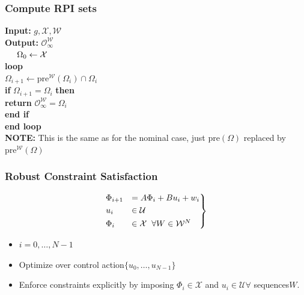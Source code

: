     \subsubsection{Compute RPI sets}
    \textbf{Input: }$g,\mathcal{X,W}$\\
    \textbf{Output: }$\mathcal{O}^\mathcal{W}_\infty$\\
        $\hspace*{5mm} \Omega_0 \leftarrow \mathcal{X}$\\
         \hspace*{5mm}\textbf{loop}\\
         \hspace*{8mm}$\Omega_{i+1} \leftarrow \textrm{pre}^\mathcal{W}(\Omega_i) \cap\Omega_i$\\
         \hspace*{8mm}\textbf{if }$\Omega_{i+1} = \Omega_i$ \textbf{then}\\
         \hspace*{10mm}\textbf{return} $\mathcal{O} ^\mathcal{W}_\infty = \Omega_i$\\
         \hspace*{8mm}\textbf{end if}\\
         \hspace*{5mm}\textbf{end loop}\\
    \textbf{NOTE:} This is the same as for the nominal case, just $\mathrm{pre}(\Omega)$ replaced by $\mathrm{pre}^\mathcal{W}(\Omega)$
    \subsubsection{Robust Constraint Satisfaction}
    \begin{minipage}{0.2\linewidth}
        \begin{align*}
        \begin{rcases}
            \Phi_{i+1} &= A\Phi_i+Bu_i + w_i\\
            u_i &\in \mathcal{U}\\
            \Phi_i &\in \mathcal{X}\hspace{2mm}\forall W \in \mathcal{W}^N
        \end{rcases}
        \end{align*}
    \end{minipage}
    \begin{minipage}{0.5\linewidth}
         \begin{itemize}
             \item $i=0,\dots,N-1$
             \item Optimize over control action$\{u_0,\dots,u_{N-1}\}$
             \item Enforce constraints explicitly by imposing $\Phi_i\in\mathcal{X}$ and $u_i\in \mathcal{U}\forall$ sequences$W$.
         \end{itemize}
    \end{minipage}
    
